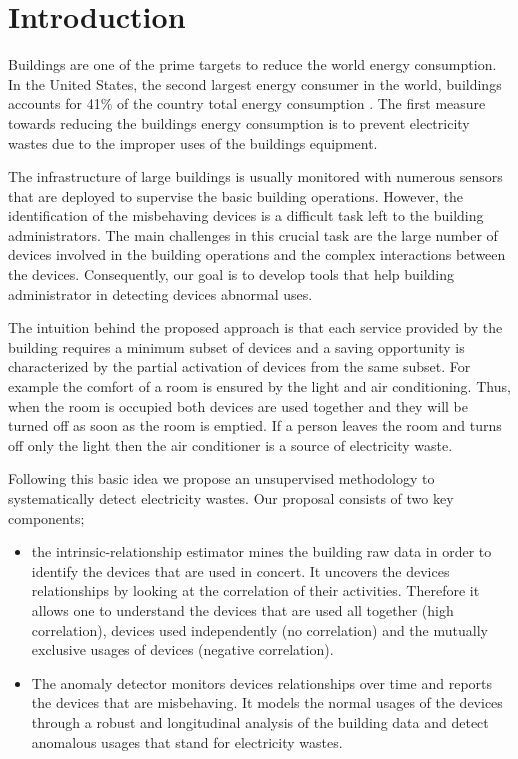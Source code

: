 \section{Introduction}
Buildings are one of the prime targets to reduce the world energy consumption.
In the United States, the second largest energy consumer in the world, buildings accounts for 41\% of the country total energy consumption \cite{aer2011}.
The first measure towards reducing the buildings energy consumption is to prevent electricity wastes due to the improper uses of the buildings equipment.

The infrastructure of large buildings is usually monitored with numerous sensors that are deployed to supervise the basic building operations.
However, the identification of the misbehaving devices is a difficult task left to the building administrators.
The main challenges in this crucial task are the large number of devices involved in the building operations and the complex interactions between the devices.
Consequently, our goal is to develop tools that help building administrator in detecting devices abnormal uses.

The intuition behind the proposed approach is that each service provided by the building requires a minimum subset of devices and a saving opportunity is characterized by the partial activation of devices from the same subset.
For example the comfort of a room is ensured by the light and air conditioning.
Thus, when the room is occupied both devices are used together and they will be turned off as soon as the room is emptied.
If a person leaves the room and turns off only the light then the air conditioner is a source of electricity waste.

Following this basic idea we propose an unsupervised methodology to systematically detect electricity wastes.
Our proposal consists of two key components;
\begin{itemize}
 \item the intrinsic-relationship estimator mines the building raw data in order to identify the devices that are used in concert.
 It uncovers the devices relationships by looking at the correlation of their activities. 
 Therefore it allows one to understand the devices that are used all together (high correlation), devices used independently (no correlation) and the mutually exclusive usages of devices (negative correlation).
 \item The anomaly detector monitors devices relationships over time and reports the devices that are misbehaving.
 It models the normal usages of the devices through a robust and longitudinal analysis of the building data and detect anomalous usages that stand for electricity wastes.
\end{itemize}


